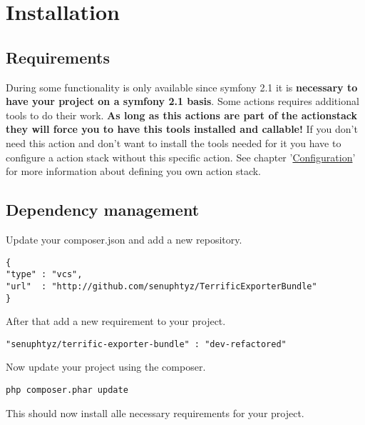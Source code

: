 
\section{Installation}


\subsection{Requirements}
During some functionality is only available since symfony 2.1 it is \textbf{necessary to have your project on a symfony 2.1 basis}. Some actions requires additional tools to do their work. \textbf{As long as this actions are part of the actionstack they will force you to have this tools installed and callable!} If you don't need this action and don't want to install the tools needed for it you have to configure a action stack without this specific action. See chapter '\mbox{\hyperlink{chap-Configuration}{Configuration}}' for more information about defining you own action stack.

\subsection{Dependency management}
Update your composer.json and add a new repository. \\

\begin{verbatim}
{
"type" : "vcs",
"url"  : "http://github.com/senuphtyz/TerrificExporterBundle"
}
\end{verbatim}

\noindent After that add a new requirement to your project. \\

\begin{verbatim}
"senuphtyz/terrific-exporter-bundle" : "dev-refactored"
\end{verbatim}
\noindent Now update your project using the composer. \\

\begin{verbatim}
php composer.phar update
\end{verbatim}
\noindent This should now install alle necessary requirements for your project. \\

